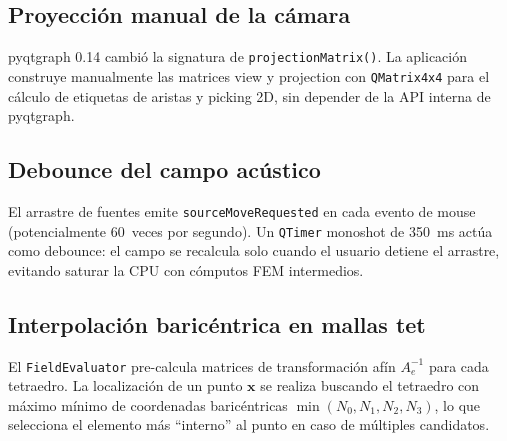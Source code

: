 \documentclass[11pt,a4paper]{article}
\begin{document}
\subsection{Proyección manual de la cámara}

pyqtgraph 0.14 cambió la signatura de \texttt{projectionMatrix()}.
La aplicación construye manualmente las matrices view y projection con
\texttt{QMatrix4x4} para el cálculo de etiquetas de aristas y picking 2D,
sin depender de la API interna de pyqtgraph.

\subsection{Debounce del campo acústico}

El arrastre de fuentes emite \texttt{sourceMoveRequested} en cada evento
de mouse (potencialmente 60~veces por segundo).  Un \texttt{QTimer}
monoshot de 350~ms actúa como debounce: el campo se recalcula solo cuando
el usuario detiene el arrastre, evitando saturar la CPU con cómputos FEM
intermedios.

\subsection{Interpolación baricéntrica en mallas tet}

El \texttt{FieldEvaluator} pre-calcula matrices de transformación afín
$A_e^{-1}$ para cada tetraedro.  La localización de un punto $\mathbf{x}$
se realiza buscando el tetraedro con máximo mínimo de coordenadas
baricéntricas $\min(N_0, N_1, N_2, N_3)$, lo que selecciona el elemento
más ``interno'' al punto en caso de múltiples candidatos.
\end{document}
